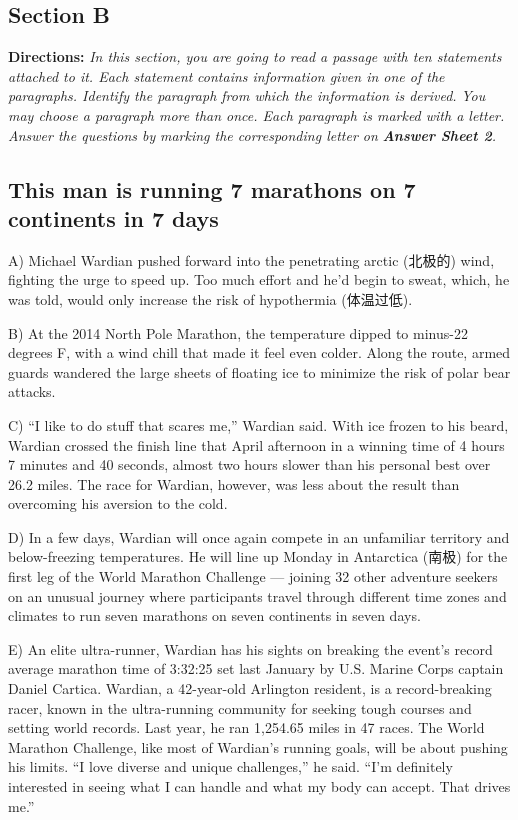 \documentclass[UTF8,11pt]{ctexart}
\begin{document}
\subsection*{\textbf{Section B}}


\textbf{Directions:} \textit{In this section, you are going to read a passage with ten statements attached to it. Each statement} \textit{contains information given in one of the paragraphs. Identify the paragraph from which the information is derived.} \textit{You may choose a paragraph more than once. Each paragraph is marked with a letter. Answer the questions by} \textit{marking the corresponding letter on }\textbf{\textit{Answer Sheet 2}}\textit{.}


\subsection*{\textbf{This man is running 7 marathons on 7 continents in 7 days}}


A) Michael Wardian pushed forward into the penetrating arctic (北极的) wind, fighting the urge to speed up. Too much effort and he’d begin to sweat, which, he was told, would only increase the risk of hypothermia (体温过低).


B) At the 2014 North Pole Marathon, the temperature dipped to minus-22 degrees F, with a wind chill that made it feel even colder. Along the route, armed guards wandered the large sheets of floating ice to minimize the risk of polar bear attacks.


C) “I like to do stuff that scares me,” Wardian said. With ice frozen to his beard, Wardian crossed the finish line that April afternoon in a winning time of 4 hours 7 minutes and 40 seconds, almost two hours slower than his personal best over 26.2 miles. The race for Wardian, however, was less about the result than overcoming his aversion to the cold.


D) In a few days, Wardian will once again compete in an unfamiliar territory and below-freezing temperatures. He will line up Monday in Antarctica (南极) for the first leg of the World Marathon Challenge — joining 32 other adventure seekers on an unusual journey where participants travel through different time zones and climates to run seven marathons on seven continents in seven days.


E) An elite ultra-runner, Wardian has his sights on breaking the event’s record average marathon time of 3:32:25 set last January by U.S. Marine Corps captain Daniel Cartica. Wardian, a 42-year-old Arlington resident, is a record-breaking racer, known in the ultra-running community for seeking tough courses and setting world records. Last year, he ran 1,254.65 miles in 47 races. The World Marathon Challenge, like most of Wardian’s running goals, will be about pushing his limits. “I love diverse and unique challenges,” he said. “I’m definitely interested in seeing what I can handle and what my body can accept. That drives me.”
\end{document}
